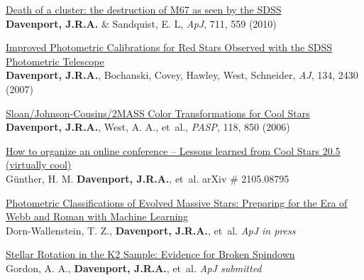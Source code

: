 \documentclass{article}
\begin{document}
\begin{llist}
\begin{etaremune}[leftmargin=10pt]
\item{\sc \href{http://adsabs.harvard.edu/abs/2010ApJ...711..559D}{\color{blue}Death of a cluster: the destruction of M67 as seen by the SDSS}}\\
{\bf Davenport, J.R.A.} \& Sandquist, E. L, {\em ApJ}, 711, 559 (2010)


 \item{\sc \href{http://adsabs.harvard.edu/abs/2007AJ....134.2430D}{\color{blue}Improved Photometric Calibrations for Red Stars Observed with the SDSS \\Photometric Telescope}}\\
{\bf Davenport, J.R.A.}, Bochanski, Covey, Hawley, West, Schneider, {\em AJ}, 134, 2430 (2007)
 
\item{\sc \href{http://adsabs.harvard.edu/abs/2006PASP..118.1679D}{\color{blue}Sloan/Johnson-Cousins/2MASS Color Transformations for Cool Stars}}\\
{\bf Davenport, J.R.A.}, West, A. A., et~al., {\em PASP}, 118, 850 (2006)
\end{etaremune}








\begin{etaremune}[leftmargin=10pt]




\item{\sc \href{https://arxiv.org/abs/2105.08795}{\color{blue} How to organize an online conference -- Lessons learned from Cool Stars 20.5 (virtually cool)}}\\
G\"{u}nther, H. M. {\bf Davenport,  J.R.A.}, et~al. arXiv \# 2105.08795

\item{\sc \href{https://arxiv.org/abs/2102.02829}{\color{blue} Photometric Classifications of Evolved Massive Stars: Preparing for the Era of Webb and Roman with Machine Learning}}\\
Dorn-Wallenstein, T. Z., {\bf Davenport,  J.R.A.}, et~al.  {\em ApJ in press}

\item{\sc \href{https://arxiv.org/abs/2101.07886}{\color{blue} Stellar Rotation in the K2 Sample: Evidence for Broken Spindown}}\\
Gordon, A. A., {\bf Davenport,  J.R.A.}, et~al.  {\em ApJ submitted}


\end{etaremune}
\end{llist}
\end{document}
